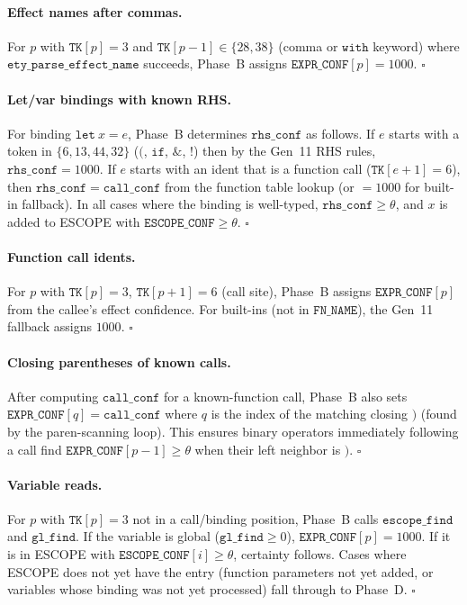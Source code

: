 \paragraph{Effect names after commas.}
For $p$ with $\mathtt{TK}[p] = 3$ and $\mathtt{TK}[p-1] \in \{28, 38\}$ (comma
or $\mathtt{with}$ keyword) where $\mathtt{ety\_parse\_effect\_name}$ succeeds,
Phase~B assigns $\mathtt{EXPR\_CONF}[p] = 1000$. $\square$

\paragraph{Let/var bindings with known RHS.}
For binding $\mathtt{let}\ x = e$, Phase~B determines $\mathtt{rhs\_conf}$ as follows.
If $e$ starts with a token in $\{6, 13, 44, 32\}$ ($($, $\mathtt{if}$, $\&$, $!$)
then by the Gen~11 RHS rules, $\mathtt{rhs\_conf} = 1000$.
If $e$ starts with an ident that is a function call ($\mathtt{TK}[e+1] = 6$),
then $\mathtt{rhs\_conf} = \mathtt{call\_conf}$ from the function table lookup
(or $= 1000$ for built-in fallback).
In all cases where the binding is well-typed, $\mathtt{rhs\_conf} \geq \theta$,
and $x$ is added to ESCOPE with $\mathtt{ESCOPE\_CONF} \geq \theta$. $\square$

\paragraph{Function call idents.}
For $p$ with $\mathtt{TK}[p] = 3$, $\mathtt{TK}[p+1] = 6$ (call site),
Phase~B assigns $\mathtt{EXPR\_CONF}[p]$ from the callee's effect confidence.
For built-ins (not in $\mathtt{FN\_NAME}$), the Gen~11 fallback assigns $1000$. $\square$

\paragraph{Closing parentheses of known calls.}
After computing $\mathtt{call\_conf}$ for a known-function call, Phase~B also
sets $\mathtt{EXPR\_CONF}[q] = \mathtt{call\_conf}$ where $q$ is the index of
the matching closing $\mathtt{)}$ (found by the paren-scanning loop).
This ensures binary operators immediately following a call find
$\mathtt{EXPR\_CONF}[p-1] \geq \theta$ when their left neighbor is $\mathtt{)}$. $\square$

\paragraph{Variable reads.}
For $p$ with $\mathtt{TK}[p] = 3$ not in a call/binding position, Phase~B
calls $\mathtt{escope\_find}$ and $\mathtt{gl\_find}$.
If the variable is global ($\mathtt{gl\_find} \geq 0$), $\mathtt{EXPR\_CONF}[p] = 1000$.
If it is in ESCOPE with $\mathtt{ESCOPE\_CONF}[i] \geq \theta$, certainty follows.
Cases where ESCOPE does not yet have the entry (function parameters not yet added,
or variables whose binding was not yet processed) fall through to Phase~D. $\square$

